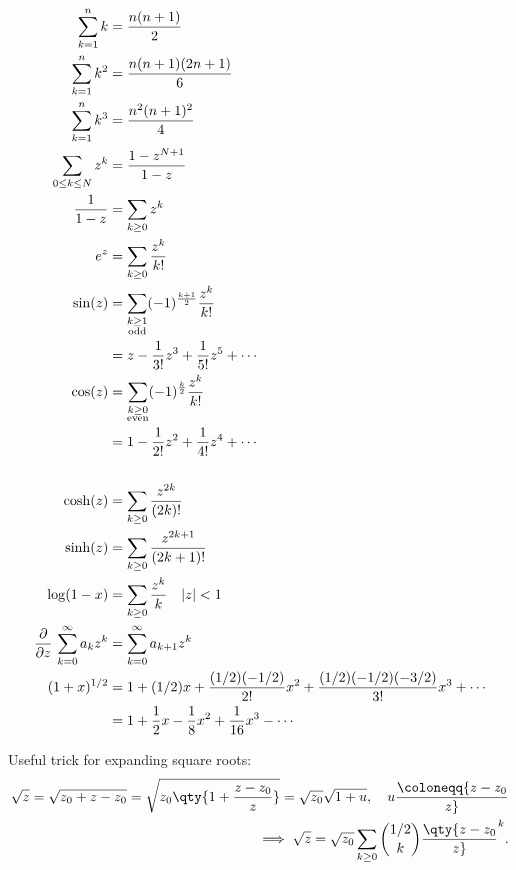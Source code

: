 \begin{fact}

\begin{align*}
\sum_{k=1}^{n} k 
  &=\frac{n(n+1)}{2} \\
\sum_{k=1}^{n} k^{2} 
  &=\frac{n(n+1)(2 n+1)}{6} \\
\sum_{k=1}^{n} k^{3} 
  &=\frac{n^{2}(n+1)^{2}}{4}  \\
\sum_{0\leq k \leq N} z^k 
  &= {1 - z^{N+1} \over 1-z} \\
{1\over 1-z} &= \sum_{k\geq 0} z^k \\
e^z &= \sum_{k\geq 0} {z^k \over k!} \\
\sin(z) 
  &= \sum_{\substack{ k \geq 1 \\ \text{odd} }} (-1)^{k+1 \over 2} {z^k \over k!} \\
  &= z - {1\over 3!}z^3 + {1\over 5!}z^5 + \cdots \\
\cos(z) 
  &= \sum_{\substack{ k \geq 0 \\ \text{even}} } (-1)^{k\over 2} {z^k \over k!} \\
  &= 1 - {1\over 2!}z^2 + {1\over 4!}z^4 + \cdots \\
  \\
\cosh(z) &= \sum_{k\geq 0} { z^{2k} \over (2k)! } \\
\sinh(z) &= \sum_{k\geq 0} { z^{2k+1} \over (2k+1)! } \\
\log(1-x) 
  &= \sum_{k \geq 0} {z^k\over k} \quad {\left\lvert {z} \right\rvert} < 1 \\
{\frac{\partial }{\partial z}\,} \sum_{k=0}^\infty a_k z^k 
  &= \sum_{k=0}^\infty a_{k+1}z^k \\
(1+x)^{1/2} 
  &= 1 + (1/2)x + {(1/2)(-1/2) \over 2!}x^2 + {(1/2)(-1/2)(-3/2) \over 3!}x^3 + \cdots \\
  &= 1 + {1\over 2} x - {1\over 8}x^2 + {1\over 16}x^3 - \cdots
\end{align*}

\end{fact}

\begin{fact}

Useful trick for expanding square roots:
\begin{align*}
\sqrt{z} = \sqrt{z_0 + z - z_0} = \sqrt{z_0 \qty{ 1 + {z-z_0 \over z} }} = \sqrt{z_0} \sqrt{1+u},\quad u\coloneqq{z-z_0 \over z} \\
\implies \sqrt{z} = \sqrt{z_0} \sum_{k\geq 0} {1/2 \choose k} \qty{z- z_0 \over z}^k
.\end{align*}

\end{fact}


